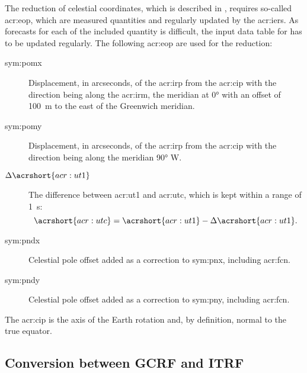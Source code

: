 The reduction of celestial coordinates, which is described in , requires so-called \gls{acr:eop}, which are measured 
quantities and regularly updated by the \gls{acr:iers}. As forecasts for each of the included quantity is difficult, the input data table for \neptune has to be updated regularly. 
The following \gls{acr:eop} are used for the reduction:
\begin{description}
 \item[\gls{sym:pomx}] Displacement, in arcseconds, of the \gls{acr:irp} from the \gls{acr:cip} with the direction being along the \gls{acr:irm}, the meridian at \ang{0;;} with an offset of \SI{100}{\metre} to the east of the Greenwich meridian.
 \item[\gls{sym:pomy}] Displacement, in arcseconds, of the \gls{acr:irp} from the \gls{acr:cip} with the direction being along the meridian \ang{90;;} W. 
 \item[$\Delta\acrshort{acr:ut1}$] The difference between \gls{acr:ut1} and \gls{acr:utc}, which is kept within a range of \SI{1}{\second}:
  \begin{equation}
   \acrshort{acr:utc} = \acrshort{acr:ut1} - \Delta\acrshort{acr:ut1}.
  \end{equation}
 \item[\gls{sym:pndx}] Celestial pole offset added as a correction to \gls{sym:pnx}, including \gls{acr:fcn}.
 \item[\gls{sym:pndy}] Celestial pole offset added as a correction to \gls{sym:pny}, including \gls{acr:fcn}.
\end{description}
The \gls{acr:cip} is the axis of the Earth rotation and, by definition, normal to the true equator.

\subsection{Conversion between GCRF and ITRF}
\label{sec:propagation-frames-gcrf-itrf}

